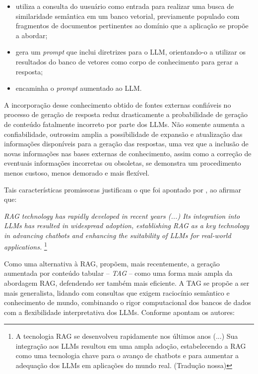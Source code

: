\begin{itemize}
    \item utiliza a consulta do uusuário como entrada para realizar uma busca de similaridade semântica em um banco vetorial, previamente populado com fragmentos de documentos pertinentes ao domínio que a aplicação se propõe a abordar;
    \item gera um \textit{prompt} que inclui diretrizes para o \ac{LLM}, orientando-o a utilizar os resultados do banco de vetores como corpo de conhecimento para gerar a resposta;
    \item encaminha o \textit{prompt} aumentado ao \ac{LLM}.
\end{itemize}

A incorporação desse conhecimento obtido de fontes externas confiáveis no processo de geração de resposta reduz drasticamente a probabilidade de geração de conteúdo fatalmente incorreto por parte dos \ac{LLM}s. Não somente aumenta a confiabilidade, outrossim amplia a possibilidade de expansão e atualização das informações disponíveis para a geração das respostas, uma vez que a inclusão de novas informações nas bases externas de conhecimento, assim como a correção de eventuais informações incorretas ou obsoletas, se demonstra um procedimento menos custoso, menos demorado e mais flexível.

Tais características promissoras justificam o que foi apontado por , ao afirmar que:

\begin{citacao}
    \textit{RAG technology has rapidly developed in recent years (...) Its integration into LLMs has resulted in widespread adoption, establishing RAG as a key technology in advancing chatbots and enhancing the suitability of LLMs for real-world applications.} \footnote{A tecnologia RAG se desenvolveu rapidamente nos últimos anos (...) Sua integração aos LLMs resultou em uma ampla adoção, estabelecendo a RAG como uma tecnologia chave para o avanço de chatbots e para aumentar a adequação dos LLMs em aplicações do mundo real. (Tradução nossa)}
\end{citacao}

Como uma alternativa à \ac{RAG},  propõem, mais recentemente, a geração aumentada por conteúdo tabular -- \textit{\ac{TAG}} -- como uma forma mais ampla da abordagem \ac{RAG}, defendendo ser também mais eficiente. A \ac{TAG} se propõe a ser mais generalista, lidando com consultas que exigem raciocínio semântico e conhecimento de mundo, combinando o rigor computacional dos bancos de dados com a flexibilidade interpretativa dos \ac{LLM}s. Conforme apontam os autores:

